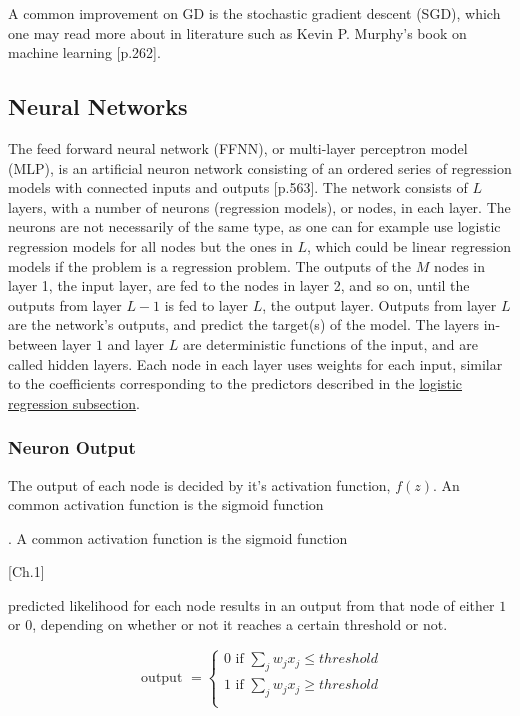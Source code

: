 \documentclass[%
oneside,                 %
final,                   %
10pt]{article}
\begin{document}
A common improvement on GD is the stochastic gradient descent (SGD), which one may read more about in literature such as Kevin P. Murphy's book on machine learning \citep{MLMurphy}[p.262].

\subsection{Neural Networks} \label{Section_M_NN}
The feed forward neural network (FFNN), or multi-layer perceptron model (MLP), is an artificial neuron network consisting of an ordered series of regression models with connected inputs and outputs \citep{MLMurphy}[p.563]. The network consists of $L$ layers, with  a number of neurons (regression models), or nodes, in each layer. The neurons are not necessarily of the same type, as one can for example use logistic regression models for all nodes but the ones in $L$, which could be linear regression models if the problem is a regression problem. The outputs of the $M$ nodes in layer 1, the input layer, are fed to the nodes in layer 2, and so on, until the outputs from layer $L-1$ is fed to layer $L$, the output layer. Outputs from layer $L$ are the network's outputs, and predict the target(s) of the model. The layers in-between layer $1$ and layer $L$ are deterministic functions of the input, and are called hidden layers.  Each node in each layer uses weights for each input, similar to the coefficients  corresponding to the predictors described in the \hyperref[Section_M_Logreg]{logistic regression subsection}. 

\subsubsection{Neuron Output}
The output of each node is decided by it's activation function, $f(z)$. An common activation function is the sigmoid function
\begin{equation}

\end{equation}

. A common activation function is the sigmoid function

 \citep{Nielsen15}[Ch.1]


predicted likelihood for each node results in an output from that node of either $1$ or $0$, depending on whether or not it reaches a certain threshold or not.



\[ \text{ output } = \begin{cases} 
      0 \text{ if } \sum_j w_j x_j \leq threshold\\
      1 \text{ if } \sum_j w_j x_j \geq threshold \\
   \end{cases}
\]
\end{document}
